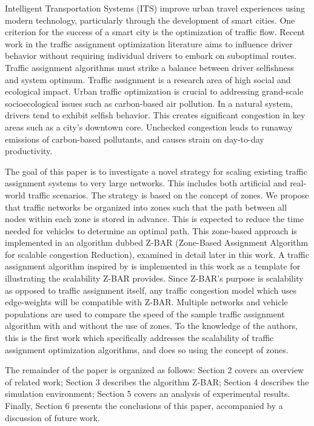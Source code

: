 \documentclass[conference]{IEEEtran}
\begin{document}
Intelligent Transportation Systems (ITS) improve urban travel experiences using modern technology, particularly through the development of smart cities. One criterion for the success of a smart city is the optimization of traffic flow. Recent work in the traffic assignment optimization literature aims to influence driver behavior without requiring individual drivers to embark on suboptimal routes. Traffic assignment algorithms must strike a balance between driver selfishness and system optimum. Traffic assignment is a research area of high social and ecological impact. Urban traffic optimization is crucial to addressing grand-scale socioecological issues such as carbon-based air pollution. In a natural system, drivers tend to exhibit selfish behavior. This creates significant congestion in key areas such as a city's downtown core. Unchecked congestion leads to runaway emissions of carbon-based pollutants, and causes strain on day-to-day productivity.

The goal of this paper is to investigate a novel strategy for scaling existing traffic assignment systems to very large networks. This includes both artificial and real-world traffic scenarios. The strategy is based on the concept of zones. We propose that traffic networks be organized into zones such that the path between all nodes within each zone is stored in advance. This is expected to reduce the time needed for vehicles to determine an optimal path. This zone-based approach is implemented in an algorithm dubbed Z-BAR (Zone-Based Assignment Algorithm for scalable congestion Reduction), examined in detail later in this work. A traffic assignment algorithm inspired by \cite{iaco} is implemented in this work as a template for illustrating the scalability Z-BAR provides. Since Z-BAR's purpose is scalability as opposed to traffic assignment itself, any traffic congestion model which uses edge-weights will be compatible with Z-BAR. Multiple networks and vehicle populations are used to compare the speed of the sample traffic assignment algorithm with and without the use of zones. To the knowledge of the authors, this is the first work which specifically addresses the scalability of traffic assignment optimization algorithms, and does so using the concept of zones.

The remainder of the paper is organized as follows: Section 2 covers an overview of related work; Section 3 describes the algorithm Z-BAR; Section 4 describes the simulation environment; Section 5 covers an analysis of experimental results. Finally, Section 6 presents the conclusions of this paper, accompanied by a discussion of future work.
\end{document}
